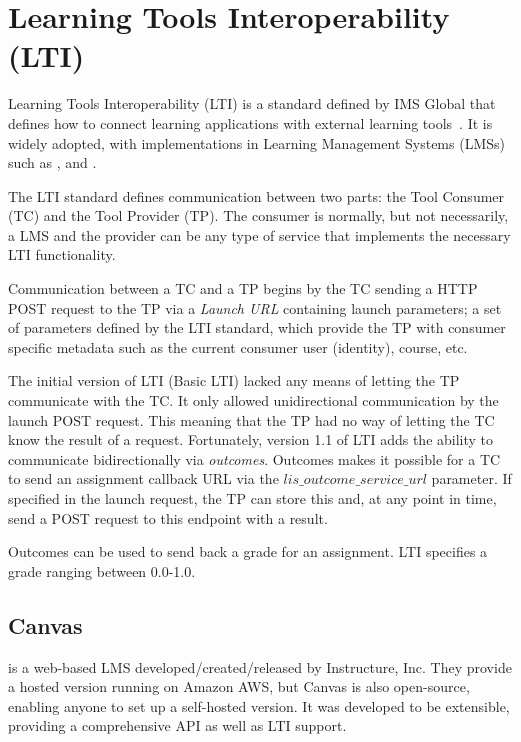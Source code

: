 \section{Learning Tools Interoperability (LTI)}
Learning Tools Interoperability (LTI) is a standard defined by IMS Global that defines how to connect learning applications with external learning tools~\citep{OleksandrA.2015LearningPlatforms}. It is widely adopted, with implementations in Learning Management Systems (LMSs) such as \cite{2008Canvas}, \cite{1997Blackboard} and \cite{2002Moodle}.

The LTI standard defines communication between two parts: the Tool Consumer (TC) and the Tool Provider (TP). The consumer is normally, but not necessarily, a LMS and the provider can be any type of service that implements the necessary LTI functionality.

Communication between a TC and a TP begins by the TC sending a HTTP POST request to the TP via a \textit{Launch URL} containing launch parameters; a set of parameters defined by the LTI standard, which provide the TP with consumer specific metadata such as the current consumer user (identity), course, etc.

The initial version of LTI (Basic LTI) lacked any means of letting the TP communicate with the TC. It only allowed unidirectional communication by the launch POST request. This meaning that the TP had no way of letting the TC know the result of a request. Fortunately, version 1.1 of LTI adds the ability to communicate bidirectionally via \textit{outcomes}. Outcomes makes it possible for a TC to send an assignment callback URL via the $lis\_outcome\_service\_url$ parameter. If specified in the launch request, the TP can store this and, at any point in time, send a POST request to this endpoint with a result.

Outcomes can be used to send back a grade for an assignment. LTI specifies a grade ranging between 0.0-1.0. %

\subsection{Canvas}

\cite{2008Canvas} is a web-based LMS developed/created/released by Instructure, Inc. They provide a hosted version running on Amazon AWS, but Canvas is also open-source, enabling anyone to set up a self-hosted version. It was developed to be extensible, providing a comprehensive API as well as LTI support.

